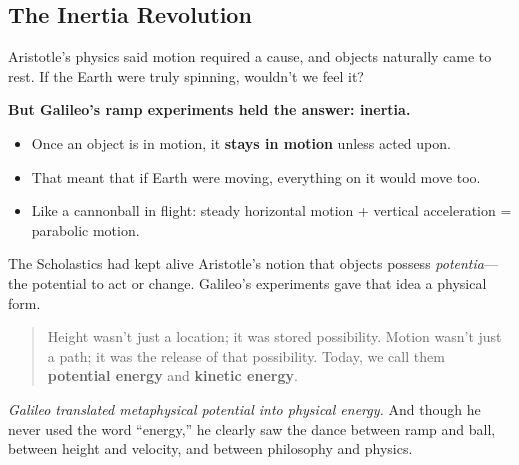\subsection{The Inertia Revolution}

Aristotle’s physics said motion required a cause, and objects naturally came to rest. If the Earth were truly spinning, wouldn’t we feel it?

\textbf{But Galileo’s ramp experiments held the answer: inertia.}

\begin{itemize}
    \item Once an object is in motion, it \textbf{stays in motion} unless acted upon.
    \item That meant that if Earth were moving, everything on it would move too.
    \item Like a cannonball in flight: steady horizontal motion + vertical acceleration = parabolic motion.
\end{itemize}


The Scholastics had kept alive Aristotle’s notion that objects possess \textit{potentia}—the potential to act or change. Galileo’s experiments gave that idea a physical form.

\begin{quote}
Height wasn’t just a location; it was stored possibility. Motion wasn’t just a path; it was the release of that possibility. Today, we call them \textbf{potential energy} and \textbf{kinetic energy}.
\end{quote}

\textit{Galileo translated metaphysical potential into physical energy.} And though he never used the word “energy,” he clearly saw the dance between ramp and ball, between height and velocity, and between philosophy and physics.


